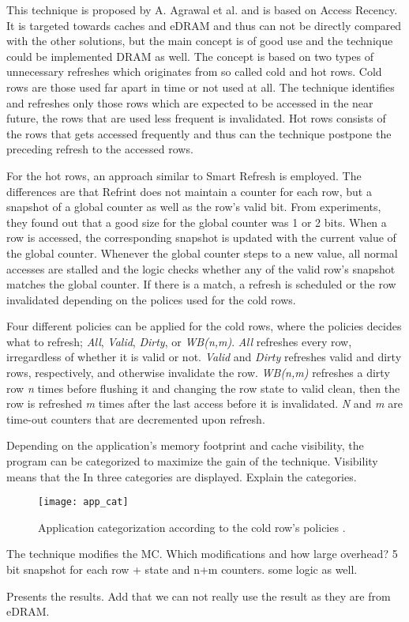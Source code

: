 This technique is proposed by A. Agrawal et al. \cite{refrint} and is based on Access Recency. It is targeted towards caches and eDRAM and thus can not be directly compared with the other solutions, but the main concept is of good use and the technique could be implemented DRAM as well. The concept is based on two types of unnecessary refreshes which originates from so called cold and hot rows. Cold rows are those used far apart in time or not used at all. The technique identifies and refreshes only those rows which are expected to be accessed in the near future, the rows that are used less frequent is invalidated. Hot rows consists of the rows that gets accessed frequently and thus can the technique postpone the preceding refresh to the accessed rows.

For the hot rows, an approach similar to Smart Refresh is employed. The differences are that Refrint does not maintain a counter for each row, but a snapshot of a global counter as well as the row's valid bit. From experiments, they found out that a good size for the global counter was 1 or 2 bits. When a row is accessed, the corresponding snapshot is updated with the current value of the global counter. Whenever the global counter steps to a new value, all normal accesses are stalled and the logic checks whether any of the valid row's snapshot  matches the global counter. If there is a match, a refresh is scheduled or the row invalidated depending on the polices used for the cold rows. 

Four different policies can be applied for the cold rows, where the policies decides what to refresh; \textit{All}, \textit{Valid}, \textit{Dirty}, or \textit{WB(n,m)}. \textit{All} refreshes every row, irregardless of whether it is valid or not. \textit{Valid} and \textit{Dirty} refreshes valid and dirty rows, respectively, and otherwise invalidate the row. \textit{WB(n,m)} refreshes a dirty row \textit{n} times before flushing it and changing the row state to valid clean, then the row is refreshed \textit{m} times after the last access before it is invalidated. \textit{N} and \textit{m} are time-out counters that are decremented upon refresh.


Depending on the application's memory footprint and cache visibility, the program can be categorized to maximize the gain of the technique. Visibility means that the In  three categories are displayed. Explain the categories.

\begin{figure}[t!]
	\texttt{[image: app\_cat]}
	\caption{Application categorization according to the cold row's policies \cite{refrint}.}
	\label{fig:app_cat}
\end{figure}

The technique modifies the MC. Which modifications and how large overhead? 5 bit snapshot for each row + state and n+m counters. some logic as well.

Presents the results. Add that we can not really use the result as they are from eDRAM.
